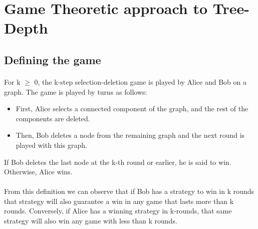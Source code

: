 \section{Game Theoretic approach to Tree-Depth}

\subsection{Defining the game}
\paragraph{}
For k $\geq$ 0, the k-step selection-deletion game is played by Alice and Bob on a graph. The game is played by turns as follows:
\begin{itemize}
  \item First, Alice selects a connected component of the graph, and the rest of the components are deleted.
  \item Then, Bob deletes a node from the remaining graph and the next round is played with this graph.
\end{itemize}

If Bob deletes the last node at the k-th round or earlier, he is said to win. Otherwise, Alice wins.
\paragraph{}
From this definition we can observe that if Bob has a strategy to win in k rounds that strategy will also guarantee a win in any game that lasts more than k rounds. Conversely, if Alice has a winning strategy in k-rounds, that same strategy will also win any game with less than k rounds.

